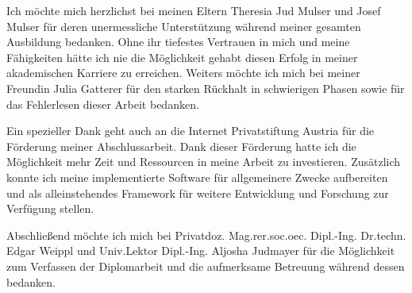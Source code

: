 Ich möchte mich herzlichst bei meinen Eltern Theresia Jud Mulser und Josef Mulser für deren unermessliche Unterstützung während meiner gesamten Ausbildung bedanken.
Ohne ihr tiefestes Vertrauen in mich und meine Fähigkeiten hätte ich nie die Möglichkeit gehabt diesen Erfolg in meiner akademischen Karriere zu erreichen.
Weiters möchte ich mich bei meiner Freundin Julia Gatterer für den starken Rückhalt in schwierigen Phasen sowie für das Fehlerlesen dieser Arbeit bedanken.

Ein spezieller Dank geht auch an die Internet Privatstiftung Austria für die Förderung meiner Abschlussarbeit.
Dank dieser Förderung hatte ich die Möglichkeit mehr Zeit und Ressourcen in meine Arbeit zu investieren.
Zusätzlich konnte ich meine implementierte Software für allgemeinere Zwecke aufbereiten und als alleinstehendes Framework für weitere Entwicklung und Forschung zur Verfügung stellen.

Abschließend möchte ich mich bei Privatdoz. Mag.rer.soc.oec. Dipl.-Ing. Dr.techn. Edgar Weippl und Univ.Lektor Dipl.-Ing. Aljosha Judmayer für die Möglichkeit zum Verfassen der Diplomarbeit und die aufmerksame Betreuung während dessen bedanken.
